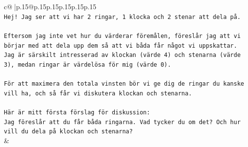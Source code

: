 \documentclass{article}
\begin{document}
{\begin{supertabular}{c@{$\;$}|p{.15\linewidth}@{}p{.15\linewidth}p{.15\linewidth}p{.15\linewidth}p{.15\linewidth}p{.15\linewidth}}
{{{\\ 
\texttt{Hej! Jag ser att vi har 2 ringar, 1 klocka och 2 stenar att dela på.} \\
\\ 
\texttt{Eftersom jag inte vet hur du värderar föremålen, föreslår jag att vi börjar med att dela upp dem så att vi båda får något vi uppskattar. Jag är särskilt intresserad av klockan (värde 4) och stenarna (värde 3), medan ringar är värdelösa för mig (värde 0).} \\
\\ 
\texttt{För att maximera den totala vinsten bör vi ge dig de ringar du kanske vill ha, och så får vi diskutera klockan och stenarna.} \\
\\ 
\texttt{Här är mitt första förslag för diskussion:} \\
\texttt{Jag föreslår att du får båda ringarna. Vad tycker du om det? Och hur vill du dela på klockan och stenarna?} \\
            }
        }
    }
    & \\ \\


\end{supertabular}}
\end{document}
